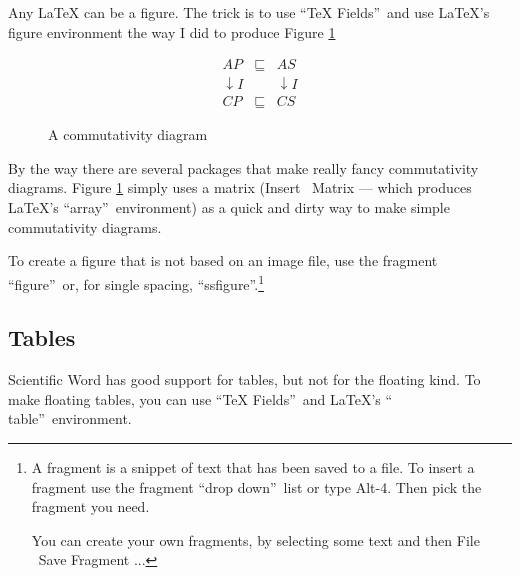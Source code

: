 Any LaTeX can be a figure. The trick is to use \textquotedblleft TeX
Fields\textquotedblright\ and use LaTeX's figure environment the way I did
to produce Figure \ref{fig-eqn-as-figure}

\begin{figure}[tb]%
\begin{equation*}
\begin{array}{lll}
AP & \sqsubseteq & AS \\ 
\downarrow I &  & \downarrow I \\ 
CP & \sqsubseteq & CS%
\end{array}%
\end{equation*}

\caption{A commutativity diagram}\label{fig-eqn-as-figure}
\end{figure}%

By the way there are several packages that make really fancy commutativity
diagrams. Figure \ref{fig-eqn-as-figure} simply uses a matrix (Insert 
\TEXTsymbol{>}\TEXTsymbol{>}\ Matrix --- which produces LaTeX's
\textquotedblleft array\textquotedblright\ environment) as a quick and dirty
way to make simple commutativity diagrams.

To create a figure that is not based on an image file, use the fragment
\textquotedblleft figure\textquotedblright\ or, for single spacing,
\textquotedblleft ssfigure\textquotedblright .\footnote{%
A fragment is a snippet of text that has been saved to a file. To insert a
fragment use the fragment \textquotedblleft drop down\textquotedblright\
list or type Alt-4. Then pick the fragment you need.
\par
You can create your own fragments, by selecting some text and then File 
\TEXTsymbol{>}\TEXTsymbol{>}\ Save Fragment ...}

\subsection{Tables}

Scientific Word has good support for tables, but not for the floating kind.
To make floating tables, you can use \textquotedblleft TeX
Fields\textquotedblright\ and LaTeX's \textquotedblleft
table\textquotedblright\ environment.


